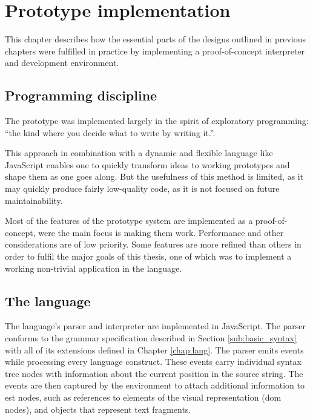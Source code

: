 \chapter{Prototype implementation}\label{chap:impl}
This chapter describes how the essential parts of the designs outlined in previous chapters were fulfilled in practice by implementing a proof-of-concept interpreter and development environment.

\section{Programming discipline}
The prototype was implemented largely in the spirit of exploratory programming:
``the kind where you decide what to write by writing it.''\cite{arc}.

This approach in combination with a dynamic and flexible language like
JavaScript enables one to quickly transform ideas to working prototypes and
shape them as one goes along. But the usefulness of this method is limited, as
it may quickly produce fairly low-quality code, as it is not focused on future
maintainability.

Most of the features of the prototype system are implemented as a proof-of-concept, were the main focus is making them work. Performance and other considerations are of low priority. Some features are more refined than others in order to fulfil the major goals of this thesis, one of which was to implement a working non-trivial application in the language.

\section{The language}
The language's parser and interpreter are implemented in JavaScript. The parser conforms to the grammar specification described in Section \ref{sub:basic_syntax} with all of its extensions defined in Chapter \ref{chap:lang}. The parser emits events while processing every language construct. These events carry individual syntax tree nodes with information about the current position in the source string. The events are then captured by the environment to attach additional information to \acrshort{est} nodes, such as references to elements of the visual representation (\acrshort{dom} nodes), and objects that represent text fragments.

